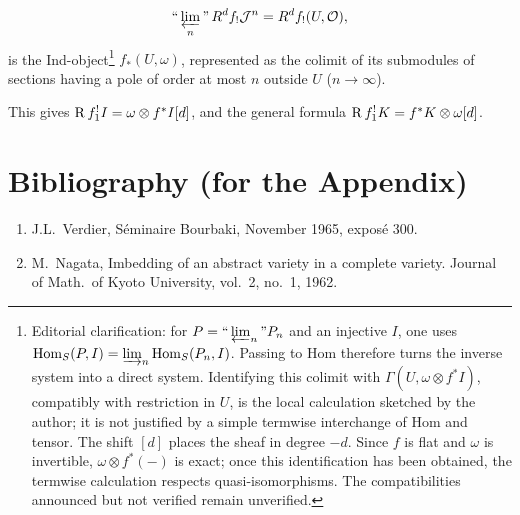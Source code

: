 \[
\text{``}\varprojlim_{n}\text{''}\,R^{d}f_{!}\mathcal{J}^{n}
 = R^{d}f_{!}(U,\mathcal{O}),
\]
is the Ind-object\footnote{Editorial clarification: for $P=\text{``}\varprojlim_n\text{''}P_n$ and an injective $I$, one uses $\operatorname{Hom}_S(P,I)=\varinjlim_n\operatorname{Hom}_S(P_n,I)$. Passing to Hom therefore turns the inverse system into a direct system. Identifying this colimit with $\Gamma(U,\omega\otimes f^*I)$, compatibly with restriction in $U$, is the local calculation sketched by the author; it is not justified by a simple termwise interchange of Hom and tensor. The shift $[d]$ places the sheaf in degree $-d$. Since $f$ is flat and $\omega$ is invertible, $\omega\otimes f^*(-)$ is exact; once this identification has been obtained, the termwise calculation respects quasi-isomorphisms. The compatibilities announced but not verified remain unverified.} $f_*(U,\omega)$, represented as the colimit of its submodules of sections having a pole of order at most $n$ outside $U$ ($n\to\infty$).

This gives $\operatorname{R} f_1^!I=\omega\otimes f^*I[d]$, and the general formula $\operatorname{R} f_1^!K=f^*K\otimes\omega[d]$.

\section*{Bibliography (for the Appendix)}
\begin{enumerate}
\item[{[1]}]\label{appen:bib1} J.L.\ Verdier, S\'eminaire Bourbaki, November 1965, expos\'e 300.
\item[{[2]}]\label{appen:bib2} M.\ Nagata, Imbedding of an abstract variety in a complete variety. Journal of Math.\ of Kyoto University, vol.\ 2, no.\ 1, 1962.
\end{enumerate}
\par\endgroup
